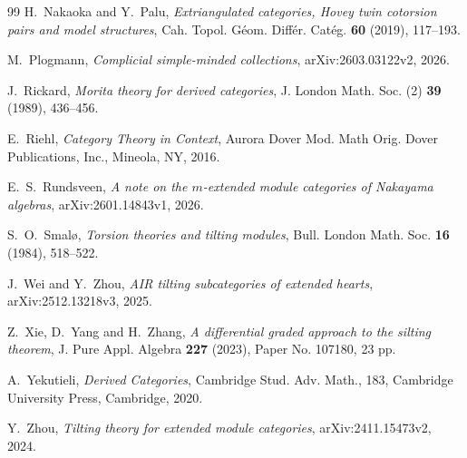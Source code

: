 \documentclass[11pt,a4paper,reqno]{amsart}
\theoremstyle{plain}
\numberwithin{equation}{section}
\theoremstyle{definition}
\begin{document}
\begin{thebibliography}{99}
H.~Nakaoka and Y.~Palu,
\emph{Extriangulated categories, Hovey twin cotorsion pairs and model structures},
Cah. Topol. G\'{e}om. Diff\'{e}r. Cat\'{e}g. \textbf{60} (2019), 117--193.

M.~Plogmann,
\emph{Complicial simple-minded collections},
arXiv:2603.03122v2, 2026.

J.~Rickard,
\emph{Morita theory for derived categories},
J. London Math. Soc. (2) \textbf{39} (1989), 436--456.

E.~Riehl,
\emph{Category Theory in Context}, 
Aurora Dover Mod. Math Orig.
Dover Publications, Inc., Mineola, NY, 2016.

E.~S.~Rundsveen,
\emph{A note on the $m$-extended module categories of Nakayama algebras},
arXiv:\allowbreak2601.14843v1, 2026.

S.~O.~Smal\o{},
\emph{Torsion theories and tilting modules},
Bull. London Math. Soc. \textbf{16} (1984), 518--522.

J.~Wei and Y.~Zhou,
\emph{AIR tilting subcategories of extended hearts},
arXiv:2512.13218v3, 2025.

Z.~Xie, D.~Yang and H.~Zhang,
\emph{A differential graded approach to the silting theorem},
J. Pure Appl. Algebra \textbf{227} (2023), Paper No. 107180, 23 pp.

A.~Yekutieli,
\emph{Derived Categories},
Cambridge Stud. Adv. Math., 183, Cambridge University Press, Cambridge, 2020.

Y.~Zhou,
\emph{Tilting theory for extended module categories},
arXiv:2411.15473v2, 2024.

\end{thebibliography}
\end{document}
